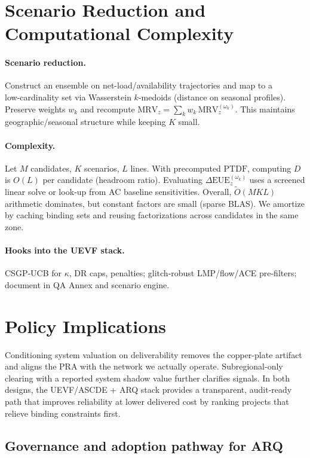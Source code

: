 \documentclass[11pt]{article}
\newcommand{\EUE}{\ensuremath{\mathrm{EUE}}}
\newcommand{\MRV}{\ensuremath{\mathrm{MRV}}}
\numberwithin{equation}{section}
\theoremstyle{definition}
\theoremstyle{remark}
\begin{document}
\section{Scenario Reduction and Computational Complexity}
\label{sec:complexity}

\paragraph{Scenario reduction.}
Construct an ensemble on net-load/availability trajectories and map to a low‑cardinality set via
Wasserstein \(k\)-medoids (distance on seasonal profiles). Preserve weights \(w_k\) and recompute
\(\MRV_z=\sum_k w_k\,\MRV_{z}^{(\omega_k)}\).
This maintains geographic/seasonal structure while keeping \(K\) small.

\paragraph{Complexity.}
Let \(M\) candidates, \(K\) scenarios, \(L\) lines.
With precomputed \(\mathrm{PTDF}\), computing \(D\) is \(O(L)\) per candidate (headroom ratio).
Evaluating \(\Delta \EUE_z^{(\omega_k)}\) uses a screened linear solve or look‑up from AC baseline sensitivities.
Overall, \(\tilde O(MK L)\) arithmetic dominates, but constant factors are small (sparse BLAS).
We amortize by caching binding sets and reusing factorizations across candidates in the same zone.

\paragraph{Hooks into the UEVF stack.}
CSGP‑UCB for \(\kappa\), DR caps, penalties; glitch‑robust LMP/flow/ACE pre‑filters; document in QA Annex and scenario engine.

\section{Policy Implications}
Conditioning system valuation on deliverability removes the copper-plate artifact and aligns the PRA with the network we actually operate. Subregional-only clearing with a reported system shadow value further clarifies signals. In both designs, the UEVF/ASCDE + ARQ stack provides a transparent, audit-ready path that improves reliability at lower delivered cost by ranking projects that relieve binding constraints first.

\subsection{Governance and adoption pathway for ARQ}
\end{document}

